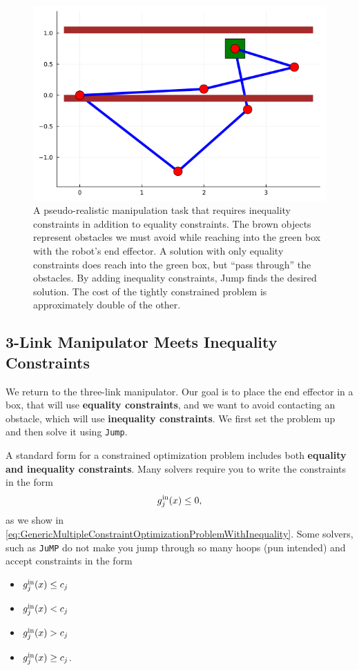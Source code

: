\bigskip
\begin{figure}[ht]
    \centering
    \includegraphics[width=0.7\columnwidth]{graphics/Chap06/constrainedInequalityOptimizationFor3LinkRobotKinematicChain.png}
    \caption{A pseudo-realistic manipulation task that requires inequality constraints in addition to equality constraints. The brown objects represent obstacles we must avoid while reaching into the green box with the robot's end effector. A solution with only equality constraints does reach into the green box, but ``pass through'' the obstacles. By adding inequality constraints, Jump finds the desired solution. The cost of the tightly constrained problem is approximately double of the other.}
    \label{fig:RealisticManipulationTasks}
\end{figure}


\bigskip

\subsection{3-Link Manipulator Meets Inequality Constraints}

We return to the three-link manipulator. Our goal is to place the end effector in a box, that will use \textbf{equality constraints}, and we want to avoid contacting an obstacle, which will use \textbf{inequality constraints}. We first set the problem up and then solve it using \texttt{Jump}.

A standard form for a constrained optimization problem includes both \textbf{equality and inequality constraints}. Many solvers require you to write the constraints in the form 
$$g^{\rm in}_j(x) \le 0, $$
as we show in \eqref{eq:GenericMultipleConstraintOptimizationProblemWithInequality}. Some solvers, such as \texttt{JuMP} do not make you jump through so many hoops (pun intended) and accept constraints in the form 
\begin{itemize}
    \item $g^{\rm in}_j(x) \le c_j$ \\
    \item $g^{\rm in}_j(x) < c_j$ \\
    \item $g^{\rm in}_j(x) > c_j$ \\
    \item $g^{\rm in}_j(x) \ge  c_j$. 
\end{itemize}

